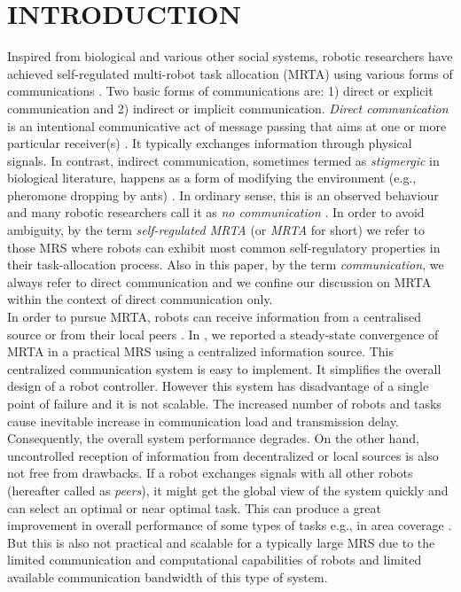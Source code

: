 \documentclass[letterpaper, 10 pt, times, conference]{ieeeconf} %
\begin{document}
\section{INTRODUCTION}
\label{sec:intro}
Inspired from biological and various other social systems, robotic researchers have achieved self-regulated multi-robot task allocation (MRTA) using various forms of communications \cite{Bonabeau+1999,Labella}. Two basic forms of communications are: 1) direct or explicit communication and 2) indirect or implicit communication. {\em Direct communication} is an intentional communicative act of message passing that aims at one or more particular receiver(s) \cite{Mataric}. It typically exchanges information through physical signals. In contrast, indirect communication, sometimes termed as {\em stigmergic} in biological literature, happens as a form of modifying the environment (e.g., pheromone dropping by ants) \cite{Bonabeau+1999}. In ordinary sense, this is an observed behaviour and many robotic researchers call it as {\em no communication} \cite{Labella}. In order to avoid ambiguity,  by the term {\em self-regulated MRTA} (or {\em  MRTA} for short) we refer to those MRS where robots can  exhibit most common self-regulatory properties \cite{Bonabeau+1999} in their task-allocation process. Also in this paper,  by the term {\em communication}, we always refer to direct communication and we confine our discussion on MRTA within the context of direct communication only.\\
In order to pursue MRTA, robots can receive information from a centralised source \cite{Krieger} or from their local peers \cite{Agassounon}. In \cite{Sarker}, we reported a steady-state convergence of MRTA in a practical MRS using a centralized information source. This centralized communication system is easy to implement. It simplifies the overall design of a robot controller. However this system has disadvantage of a single point of failure and it is not scalable. The increased number of robots and tasks cause inevitable increase in communication load and transmission delay. Consequently, the overall system performance degrades. On the other hand, uncontrolled reception of information from decentralized or local sources is also not free from drawbacks. If a robot exchanges signals with all other robots (hereafter called as {\em peers}), it might get the global view of the system quickly and can select an optimal or near optimal task. This can produce a great improvement in overall performance of some types of tasks e.g., in area coverage \cite{Rutishauser}. But this is also not practical and scalable for a typically large MRS due to the limited communication and computational capabilities of robots and limited available communication bandwidth of this type of system.\\ 
\end{document}
